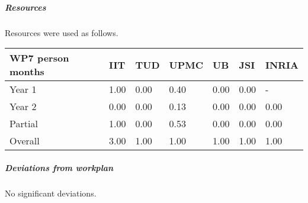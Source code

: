

\subparagraph{Resources}

Resources were used as follows.

\begin{center}
\begin{tabular}{|C{1.5cm}|C{1.5cm}|C{1.5cm}|C{2cm}|C{2cm}|C{2cm}|C{2cm}|}
\hline
\footnotesize \textbf{WP7 person months}& \footnotesize \textbf{IIT}&\footnotesize \textbf{TUD}&\footnotesize \textbf{UPMC}& \footnotesize \textbf{UB} &\footnotesize \textbf{JSI} & \footnotesize \textbf{INRIA} \\ \hline
\footnotesize Year 1 &  1.00 & 0.00 & 0.40 & 0.00 & 0.00 & - \\  \hline
\footnotesize Year 2 &  0.00 & 0.00 & 0.13 & 0.00 & 0.00 & 0.00 \\  \hline
\footnotesize Partial & 1.00 & 0.00 & 0.53 & 0.00 & 0.00 & 0.00 \\ \hline \hline
\footnotesize Overall & 3.00 & 1.00 & 1.00 & 1.00 & 1.00 & 1.00 \\ \hline
\end{tabular}
\end{center}

\subparagraph{Deviations from workplan} 
No significant deviations. 